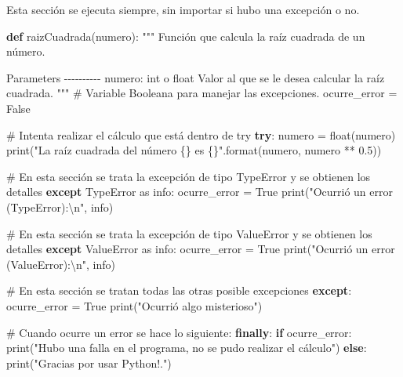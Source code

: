\documentclass[
  spanish,
  letterpaper,
]{scrbook}
\newenvironment{Shaded}{\begin{snugshade}}{\end{snugshade}}
\newcommand{\BuiltInTok}[1]{\textcolor[rgb]{0.00,0.23,0.31}{#1}}
\newcommand{\CharTok}[1]{\textcolor[rgb]{0.13,0.47,0.30}{#1}}
\newcommand{\CommentTok}[1]{\textcolor[rgb]{0.37,0.37,0.37}{#1}}
\newcommand{\ControlFlowTok}[1]{\textcolor[rgb]{0.00,0.23,0.31}{\textbf{#1}}}
\newcommand{\FloatTok}[1]{\textcolor[rgb]{0.68,0.00,0.00}{#1}}
\newcommand{\ImportTok}[1]{\textcolor[rgb]{0.00,0.46,0.62}{#1}}
\newcommand{\KeywordTok}[1]{\textcolor[rgb]{0.00,0.23,0.31}{\textbf{#1}}}
\newcommand{\NormalTok}[1]{\textcolor[rgb]{0.00,0.23,0.31}{#1}}
\newcommand{\OperatorTok}[1]{\textcolor[rgb]{0.37,0.37,0.37}{#1}}
\newcommand{\PreprocessorTok}[1]{\textcolor[rgb]{0.68,0.00,0.00}{#1}}
\newcommand{\SpecialCharTok}[1]{\textcolor[rgb]{0.37,0.37,0.37}{#1}}
\newcommand{\StringTok}[1]{\textcolor[rgb]{0.13,0.47,0.30}{#1}}
\newcommand{\VariableTok}[1]{\textcolor[rgb]{0.07,0.07,0.07}{#1}}
\theoremstyle{definition}
\theoremstyle{remark}
\begin{document}
Esta sección se ejecuta siempre, sin importar si hubo una excepción o
no.

\begin{Shaded}
\begin{Highlighting}[]
\KeywordTok{def}\NormalTok{ raizCuadrada(numero):}
    \CommentTok{"""}
\CommentTok{    Función que calcula la raíz cuadrada de un número.}

\CommentTok{    Parameters}
\CommentTok{    {-}{-}{-}{-}{-}{-}{-}{-}{-}{-}}
\CommentTok{    numero: int o float}
\CommentTok{    Valor al que se le desea calcular la raíz cuadrada.}
\CommentTok{    }
\CommentTok{    """}
    \CommentTok{\# Variable Booleana para manejar las excepciones.}
\NormalTok{    ocurre\_error }\OperatorTok{=} \VariableTok{False}
    
    \CommentTok{\# Intenta realizar el cálculo que está dentro de try}
    \ControlFlowTok{try}\NormalTok{:}
\NormalTok{        numero }\OperatorTok{=} \BuiltInTok{float}\NormalTok{(numero)}
        \BuiltInTok{print}\NormalTok{(}\StringTok{"La raíz cuadrada del número }\SpecialCharTok{\{\}}\StringTok{ es }\SpecialCharTok{\{\}}\StringTok{"}\NormalTok{.}\BuiltInTok{format}\NormalTok{(numero, numero }\OperatorTok{**} \FloatTok{0.5}\NormalTok{))}

    \CommentTok{\# En esta sección se trata la excepción de tipo TypeError y se obtienen los detalles  }
    \ControlFlowTok{except} \PreprocessorTok{TypeError} \ImportTok{as}\NormalTok{ info:}
\NormalTok{        ocurre\_error }\OperatorTok{=} \VariableTok{True}
        \BuiltInTok{print}\NormalTok{(}\StringTok{"Ocurrió un error (TypeError):}\CharTok{\textbackslash{}n}\StringTok{"}\NormalTok{, info)}

    \CommentTok{\# En esta sección se trata la excepción de tipo ValueError y se obtienen los detalles  }
    \ControlFlowTok{except} \PreprocessorTok{ValueError} \ImportTok{as}\NormalTok{ info:}
\NormalTok{        ocurre\_error }\OperatorTok{=} \VariableTok{True}
        \BuiltInTok{print}\NormalTok{(}\StringTok{"Ocurrió un error (ValueError):}\CharTok{\textbackslash{}n}\StringTok{"}\NormalTok{, info)}

    \CommentTok{\# En esta sección se tratan todas las otras posible excepciones}
    \ControlFlowTok{except}\NormalTok{:}
\NormalTok{        ocurre\_error }\OperatorTok{=} \VariableTok{True}
        \BuiltInTok{print}\NormalTok{(}\StringTok{"Ocurrió algo misterioso"}\NormalTok{)}

    \CommentTok{\# Cuando ocurre un error se hace lo siguiente:}
    \ControlFlowTok{finally}\NormalTok{:}
        \ControlFlowTok{if}\NormalTok{ ocurre\_error:}
            \BuiltInTok{print}\NormalTok{(}\StringTok{"Hubo una falla en el programa, no se pudo realizar el cálculo"}\NormalTok{)}
        \ControlFlowTok{else}\NormalTok{:}
            \BuiltInTok{print}\NormalTok{(}\StringTok{"Gracias por usar Python!."}\NormalTok{)}
\end{Highlighting}
\end{Shaded}
\end{document}
